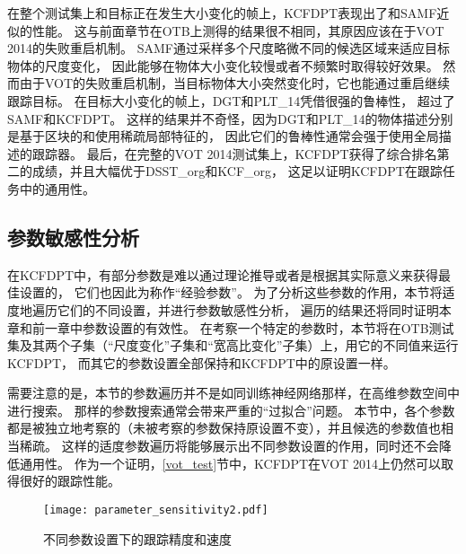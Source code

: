 在整个测试集上和目标正在发生大小变化的帧上，KCFDPT表现出了和SAMF近似的性能。
这与前面章节在OTB上测得的结果很不相同，其原因应该在于VOT 2014的失败重启机制。
SAMF通过采样多个尺度略微不同的候选区域来适应目标物体的尺度变化，
因此能够在物体大小变化较慢或者不频繁时取得较好效果。
然而由于VOT的失败重启机制，当目标物体大小突然变化时，它也能通过重启继续跟踪目标。
在目标大小变化的帧上，DGT和PLT\_14凭借很强的鲁棒性，
超过了SAMF和KCFDPT。
这样的结果并不奇怪，因为DGT和PLT\_14的物体描述分别是基于区块的和使用稀疏局部特征的，
因此它们的鲁棒性通常会强于使用全局描述的跟踪器。
最后，在完整的VOT 2014测试集上，KCFDPT获得了综合排名第二的成绩，并且大幅优于DSST\_org和KCF\_org，
这足以证明KCFDPT在跟踪任务中的通用性。

\subsection{参数敏感性分析}
\label{parameter-sensitivity}
在KCFDPT中，有部分参数是难以通过理论推导或者是根据其实际意义来获得最佳设置的，
它们也因此为称作``经验参数''。
为了分析这些参数的作用，本节将适度地遍历它们的不同设置，并进行参数敏感性分析，
遍历的结果还将同时证明本章和前一章中参数设置的有效性。
在考察一个特定的参数时，本节将在OTB测试集及其两个子集（``尺度变化''子集和``宽高比变化''子集）上，用它的不同值来运行KCFDPT，
而其它的参数设置全部保持和KCFDPT中的原设置一样。

需要注意的是，本节的参数遍历并不是如同训练神经网络那样，在高维参数空间中进行搜索。
那样的参数搜索通常会带来严重的``过拟合''问题。
本节中，各个参数都是被独立地考察的（未被考察的参数保持原设置不变），并且候选的参数值也相当稀疏。
这样的适度参数遍历将能够展示出不同参数设置的作用，同时还不会降低通用性。
作为一个证明，\ref{vot_test}节中，KCFDPT在VOT 2014上仍然可以取得很好的跟踪性能。

\begin{figure}[htb]
\centering
		\texttt{[image: parameter\_sensitivity2.pdf]}
	\caption{不同参数设置下的跟踪精度和速度}
	\label{parameter_sensitivity}
\end{figure}

